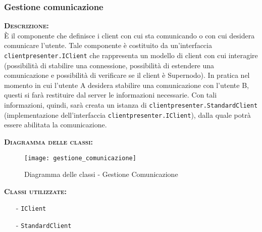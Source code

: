 \subsubsection{Gestione comunicazione}
\begin{description}
	\item{\scshape\bfseries Descrizione:}\\
È il componente che definisce i client con cui sta comunicando o con cui desidera comunicare l'utente. Tale componente è costituito da un'interfaccia \texttt{clientpresenter.IClient} che rappresenta un modello di client con cui interagire (possibilità di stabilire una connessione, possibilità di estendere una comunicazione e possibilità di verificare se il client è Supernodo). In pratica nel momento in cui l'utente A desidera stabilire una comunicazione con l'utente B, questi si farà restituire dal server le informazioni necessarie. Con tali informazioni, quindi, sarà creata un istanza di \texttt{clientpresenter.StandardClient} (implementazione dell'interfaccia \texttt{clientpresenter.IClient}), dalla quale potrà essere abilitata la comunicazione.
	\item{\scshape\bfseries Diagramma delle classi:}
	\begin{figure}[H]
\begin{center}
\texttt{[image: gestione\_comunicazione]}
\caption{Diagramma delle classi - Gestione Comunicazione}\label{fig:gestione_comunicazione}
\end{center}
\end{figure}
	\item{\scshape\bfseries Classi utilizzate:} 
	\begin{itemize}[noitemsep,nolistsep]
		\item[-] \texttt{IClient}
		\item[-] \texttt{StandardClient}
	\end{itemize}  
\end{description}


